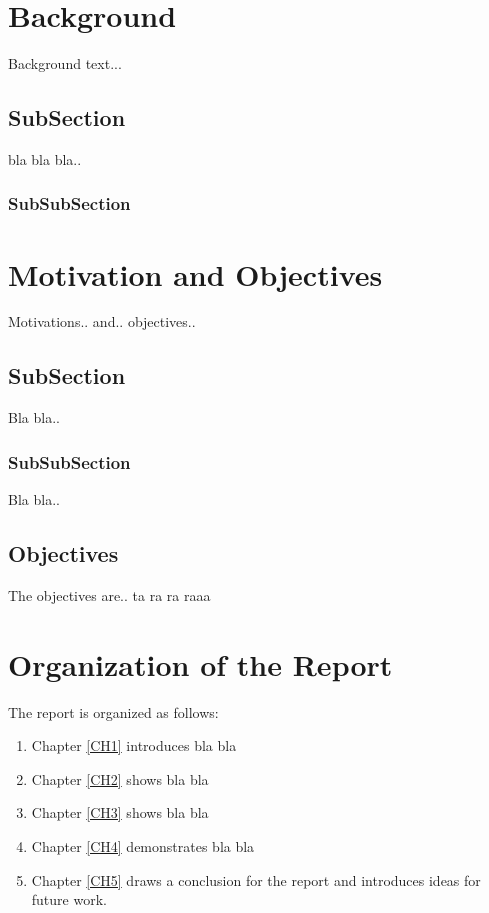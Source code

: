 \section{Background}

Background text...

\subsection{SubSection}

bla bla bla..

\subsubsection{SubSubSection}

\section{Motivation and Objectives}

Motivations.. and.. objectives..

\subsection{SubSection}

Bla bla..

\subsubsection{SubSubSection}

Bla bla..

\subsection{Objectives}

The objectives are.. ta ra ra raaa

\section{Organization of the Report}

The report is organized as follows:

\begin{enumerate}
\item Chapter \ref{CH1} introduces bla bla
\item Chapter \ref{CH2} shows bla bla
\item Chapter \ref{CH3} shows bla bla
\item Chapter \ref{CH4} demonstrates bla bla
\item Chapter \ref{CH5} draws a conclusion for the report and introduces ideas for future work.
\end{enumerate}